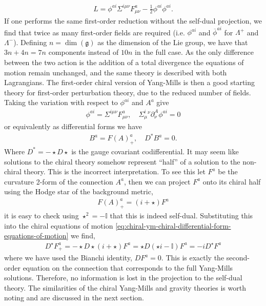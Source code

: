 \documentclass[10pt]{report}
\theoremstyle{definition}
\newcommand{\id}{\mathbb{I}}
\begin{document}
\begin{align}
    L = \phi^{ai} \Sigma^{i\mu\nu} F^a_{\mu\nu} - \frac{1}{2} \phi^{ai} \phi^{ai}. 
\end{align}
If one performs the same first-order reduction without the self-dual projection, we find that twice as many first-order fields are required (i.e. $\phi^{ai}$ and $\overline{\phi}^{ai}$ for $\Lambda^+$ and $\Lambda^-$). Defining $n = \dim(\mathfrak{g})$ as the dimension of the Lie group, we have that $3n + 4n = 7n$ components instead of $10n$ in the full case. As the only difference between the two action is the addition of a total divergence the equations of motion remain unchanged, and the same theory is described with both Lagrangians. The first-order chiral version of Yang-Mills is then a good starting theory for first-order perturbation theory, due to the reduced number of fields. Taking the variation with respect to $\phi^{ai}$ and $A^a$ give 
\begin{align}
    \phi^{ai} = \Sigma^{i\mu\nu} F^a_{\mu\nu}, \quad \Sigma^i_\mu{}^\nu \partial^A_\nu \phi^{ai} = 0
\end{align}
or equivalently as differential forms we have 
\begin{align}
    B^a = F{(A)}^a_+, \quad D^* B^a = 0. \label{eq:chiral-ym-chiral-differential-form-equations-of-motion}
\end{align}
Where $D^* = - \star D \star$ is the gauge covariant codifferential. It may seem like solutions to the chiral theory somehow represent ``half'' of a solution to the non-chiral theory. This is the incorrect interpretation. To see this let $F^a$ be the curvature 2-form of the connection $A^a$, then we can project $F^a$ onto its chiral half using the Hodge star of the background metric,
\begin{align}
    F{(A)}^a_+ = (i + \star) F^a
\end{align}
it is easy to check using $\star^2 = - \id$ that this is indeed self-dual. Substituting this into the chiral equations of motion \cref{eq:chiral-ym-chiral-differential-form-equations-of-motion} we find,
\begin{align}
    D^\star F^a_+ = - \star D \star (i+\star) F^a = \star D (\star i - \id) F^a = -i D^\star F^a
\end{align}
where we have used the Bianchi identity, $D F^a = 0$. This is exactly the second-order equation on the connection that corresponds to the full Yang-Mills solutions. Therefore, no information is lost in the projection to the self-dual theory. The similarities of the chiral Yang-Mills and gravity theories is worth noting and are discussed in the next section.
\end{document}

